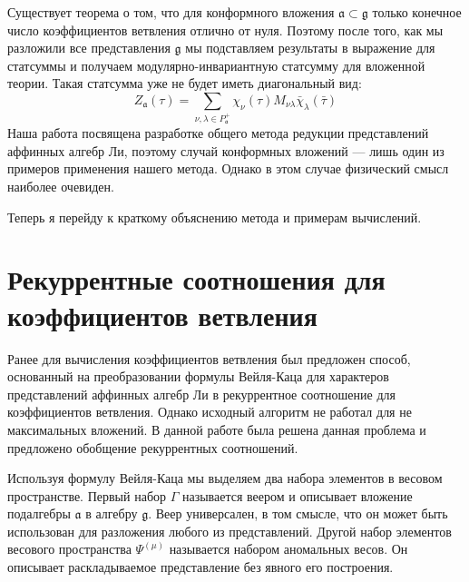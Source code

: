 \documentclass[a4paper,12pt]{article}
\theoremstyle{definition} \newtheorem{Def}{Definition}
\begin{document}
Существует теорема о том, что для конформного вложения  $\mathfrak{a}\subset\mathfrak{g}$ только
конечное число коэффициентов ветвления отлично от нуля. Поэтому после того, как мы разложили все
представления $\mathfrak{g}$ мы подставляем результаты в выражение для статсуммы и получаем
модулярно-инвариантную статсумму для вложенной теории. Такая статсумма уже не будет иметь
диагональный вид:
\begin{equation}
  \label{eq:36}
   Z_{\mathfrak{a}}(\tau)=\sum_{ \nu,\lambda\in P^{+}_{\mathfrak{a}}} \chi_{\nu}(\tau)M_{\nu\lambda}\bar \chi_{\lambda}(\bar \tau)
\end{equation}
Наша работа посвящена разработке общего метода редукции представлений аффинных алгебр Ли, поэтому
случай конформных вложений --- лишь один из примеров применения нашего метода. Однако в этом случае
физический смысл наиболее очевиден. 

Теперь я перейду к краткому объяснению метода и примерам вычислений.

\section{Рекуррентные соотношения для коэффициентов ветвления}
\label{sec:branching}

Ранее для вычисления коэффициентов ветвления был предложен способ, основанный на преобразовании
формулы Вейля-Каца для характеров представлений аффинных алгебр Ли в рекуррентное соотношение для
коэффициентов ветвления. Однако исходный алгоритм не работал для не максимальных вложений. В данной
работе была решена данная проблема и предложено обобщение рекуррентных соотношений. 

Используя формулу Вейля-Каца мы выделяем два набора элементов в весовом пространстве. Первый набор $\Gamma$
называется веером и описывает вложение подалгебры $\mathfrak{a}$ в алгебру $\mathfrak{g}$. Веер
универсален, в том смысле, что он может быть использован для разложения любого из представлений.
Другой набор элементов весового пространства $\Psi ^{\left( \mu \right) }$ называется набором
аномальных весов. Он описывает раскладываемое представление без явного его построения. 
\end{document}
